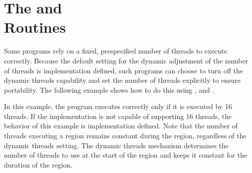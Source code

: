 \pagebreak
\chapter{The  and \\
 Routines}
\label{chap:set_dynamic_nthrs}

Some programs rely on a fixed, prespecified number of threads to execute correctly. 
Because the default setting for the dynamic adjustment of the number of threads 
is implementation defined, such programs can choose to turn off the dynamic threads 
capability and set the number of threads explicitly to ensure portability. The 
following example shows how to do this using , and .

In this example, the program executes correctly only if it is executed by 16 threads. 
If the implementation is not capable of supporting 16 threads, the behavior of 
this example is implementation defined. Note that the number of threads executing 
a  region remains constant during the region, regardless of the 
dynamic threads setting. The dynamic threads mechanism determines the number of 
threads to use at the start of the  region and keeps it constant 
for the duration of the region.




